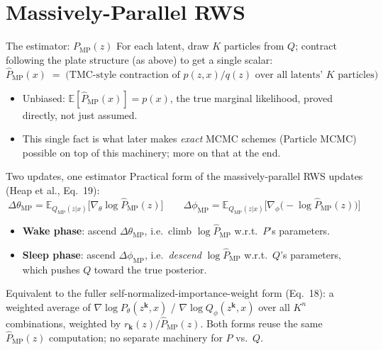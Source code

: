 \documentclass[aspectratio=169]{beamer}
\begin{document}
\section{Massively-Parallel RWS}

\begin{frame}{The estimator: $P_{\text{MP}}(z)$}
  For each latent, draw $K$ particles from $Q$; contract following the plate
  structure (as above) to get a single scalar:
  \[
    \hat{P}_{\text{MP}}(x) \;=\; \text{(TMC-style contraction of } p(z,x)/q(z)
    \text{ over all latents' } K \text{ particles)}
  \]
  \begin{itemize}
    \item \alert{Unbiased}: $\mathbb{E}[\hat P_{\text{MP}}(x)] = p(x)$, the
      true marginal likelihood, proved directly, not just assumed.
    \item This single fact is what later makes \emph{exact} MCMC schemes
      (Particle MCMC) possible on top of this machinery; more on that at
      the end.
  \end{itemize}
\end{frame}

\begin{frame}{Two updates, one estimator}
  Practical form of the massively-parallel RWS updates (Heap et al., Eq.\ 19):
  \[
    \Delta\theta_{\text{MP}} = \mathbb{E}_{Q_{\text{MP}}(z|x)}\big[\nabla_\theta \log \hat P_{\text{MP}}(z)\big]
    \qquad
    \Delta\phi_{\text{MP}} = \mathbb{E}_{Q_{\text{MP}}(z|x)}\big[\nabla_\phi \big(-\log \hat P_{\text{MP}}(z)\big)\big]
  \]
  \begin{itemize}
    \item \textbf{Wake phase}: ascend $\Delta\theta_{\text{MP}}$, i.e.\ climb
      $\log \hat P_{\text{MP}}$ w.r.t.\ $P$'s parameters.
    \item \textbf{Sleep phase}: ascend $\Delta\phi_{\text{MP}}$, i.e.\
      \emph{descend} $\log \hat P_{\text{MP}}$ w.r.t.\ $Q$'s parameters, which
      pushes $Q$ toward the true posterior.
  \end{itemize}
  \vfill
  \small Equivalent to the fuller self-normalized-importance-weight form
  (Eq.\ 18): a weighted average of $\nabla \log P_\theta(z^{\mathbf{k}},x)$ /
  $\nabla \log Q_\phi(z^{\mathbf{k}},x)$ over all $K^n$ combinations, weighted
  by $r_{\mathbf{k}}(z)/\hat P_{\text{MP}}(z)$. Both forms reuse the same
  $\hat P_{\text{MP}}(z)$ computation; no separate machinery for $P$ vs.\ $Q$.
\end{frame}
\end{document}
